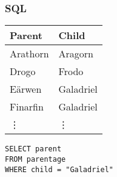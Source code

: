 \documentclass[xcolor=table]{beamer}
\begin{document}



\begin{frame}
  \frametitle{SQL}
  \large

  \begin{minipage}{0.4\textwidth}
    \centering
    \begin{tabular}{l|l}
      \textbf{Parent} & \textbf{Child}\\\hline
      Arathorn & Aragorn\\
      Drogo & Frodo\\
      E\"arwen & Galadriel\\
      Finarfin & Galadriel\\
      \rowcolor{white}
      \hfill\vdots & \hfill\vdots
    \end{tabular}
  \end{minipage}
  \hfill
  \begin{minipage}{0.51\textwidth}
    \texttt{SELECT parent\\FROM parentage\\WHERE child = "Galadriel"}
  \end{minipage}
\end{frame}
\end{document}
